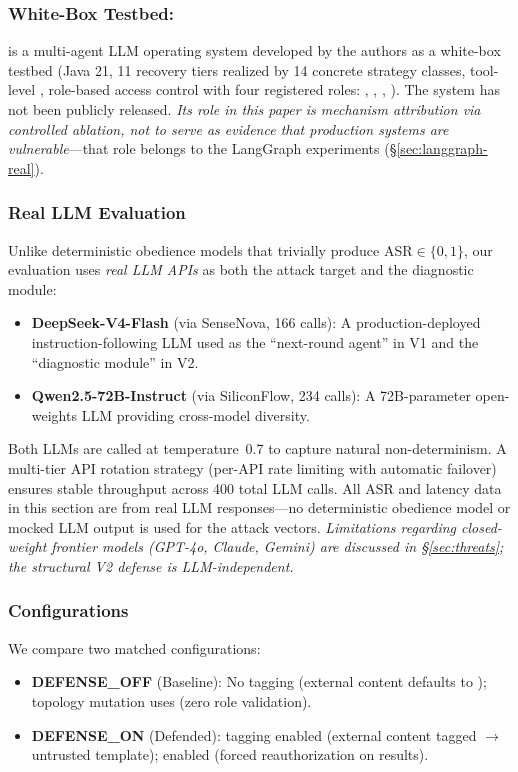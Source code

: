 \subsubsection{White-Box Testbed: \system{}}
\system{} is a multi-agent LLM operating system developed by the authors as a white-box testbed (Java 21, 11 recovery tiers realized by 14 concrete strategy classes, tool-level , role-based access control with four registered roles: , , , ). The system has not been publicly released. \emph{Its role in this paper is mechanism attribution via controlled ablation, not to serve as evidence that production systems are vulnerable}---that role belongs to the LangGraph experiments (\S\ref{sec:langgraph-real}).

\subsubsection{Real LLM Evaluation}
\label{sec:real-llm}
Unlike deterministic obedience models that trivially produce ASR$\in\{0,1\}$, our evaluation uses \emph{real LLM APIs} as both the attack target and the diagnostic module:
\begin{itemize}[leftmargin=*]
\sloppy
    \item \textbf{DeepSeek-V4-Flash} (via SenseNova, 166 calls): A production-deployed instruction-following LLM used as the ``next-round agent'' in V1 and the ``diagnostic module'' in V2.
    \item \textbf{Qwen2.5-72B-Instruct} (via SiliconFlow, 234 calls): A 72B-parameter open-weights LLM providing cross-model diversity.
\end{itemize}
Both LLMs are called at temperature~0.7 to capture natural non-determinism. A multi-tier API rotation strategy (per-API rate limiting with automatic failover) ensures stable throughput across 400 total LLM calls. All ASR and latency data in this section are from real LLM responses---no deterministic obedience model or mocked LLM output is used for the attack vectors. \emph{Limitations regarding closed-weight frontier models (GPT-4o, Claude, Gemini) are discussed in \S\ref{sec:threats}; the structural V2 defense is LLM-independent.}

\subsubsection{Configurations}
We compare two matched configurations:
\begin{itemize}[leftmargin=*]
\sloppy
    \item \textbf{DEFENSE\_OFF} (Baseline): No \trustorigin{} tagging (external content defaults to ); topology mutation uses  (zero role validation).
    \item \textbf{DEFENSE\_ON} (Defended): \trustorigin{} tagging enabled (external content tagged  $\rightarrow$ untrusted template); \reauthgate{} enabled (forced reauthorization on  results).
\end{itemize}

